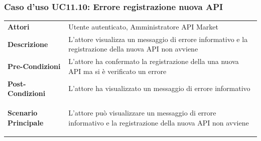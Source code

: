 \subsubsection{Caso d'uso UC11.10: Errore registrazione nuova API}
\label{UC11_10}

\begin{minipage}{\linewidth}
	\begin{tabular}{ l | p{11cm}}
		\hline
		\rowcolor{Gray}
		\multicolumn{2}{c}{UC11.10 - Errore registrazione nuova API} \\
		\hline
		\textbf{Attori} & Utente autenticato, Amministratore API Market \\
		\textbf{Descrizione} & L'attore visualizza un messaggio di errore informativo e la registrazione della nuova API non avviene \\
		\textbf{Pre-Condizioni} & L'attore ha confermato la registrazione della una nuova API ma si è verificato un errore \\
		\textbf{Post-Condizioni} & L'attore ha visualizzato un messaggio di errore informativo \\
		\textbf{Scenario Principale} & 
		\begin{enumerate*}[label=(\arabic*.),itemjoin={\newline}]
			\item L'attore può visualizzare un messaggio di errore informativo e la registrazione della nuova API non avviene
		\end{enumerate*}\\
	\end{tabular}
\end{minipage}